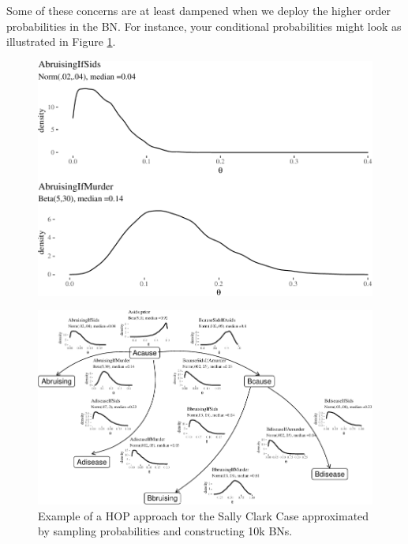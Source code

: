 \documentclass[
  10pt,
  dvipsnames,enabledeprecatedfontcommands]{scrartcl}
\begin{document}
Some of these concerns are at least dampened when we deploy the higher
order probabilities in the BN. For instance, your conditional
probabilities might look as illustrated in Figure \ref{fig:SCwithHOPa}.

\begin{figure}

\begin{center}\includegraphics[width=0.9\linewidth]{imprecision_weight_files/figure-latex/fig:SCwithHOPa-1} \end{center}

\caption{}
\label{fig:SCwithHOPa}
\end{figure}

\pagebreak 
\begin{figure}

\begin{center}\includegraphics[width=1.6\linewidth,height=2\textheight,angle=90]{imprecision_weight_files/figure-latex/SCwithHOP-1} \end{center}

\caption{Example of a HOP approach tor the Sally Clark Case  approximated by sampling probabilities  and constructing 10k BNs.}
\end{figure}
\end{document}
